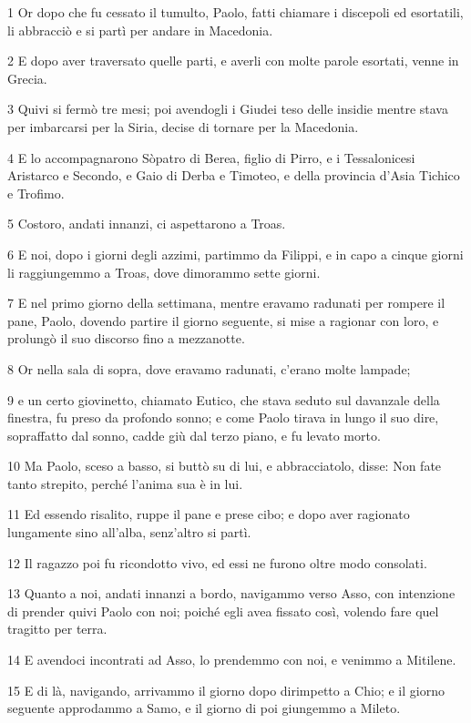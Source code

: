 \par 1 Or dopo che fu cessato il tumulto, Paolo, fatti chiamare i discepoli ed esortatili, li abbracciò e si partì per andare in Macedonia.
\par 2 E dopo aver traversato quelle parti, e averli con molte parole esortati, venne in Grecia.
\par 3 Quivi si fermò tre mesi; poi avendogli i Giudei teso delle insidie mentre stava per imbarcarsi per la Siria, decise di tornare per la Macedonia.
\par 4 E lo accompagnarono Sòpatro di Berea, figlio di Pirro, e i Tessalonicesi Aristarco e Secondo, e Gaio di Derba e Timoteo, e della provincia d'Asia Tichico e Trofimo.
\par 5 Costoro, andati innanzi, ci aspettarono a Troas.
\par 6 E noi, dopo i giorni degli azzimi, partimmo da Filippi, e in capo a cinque giorni li raggiungemmo a Troas, dove dimorammo sette giorni.
\par 7 E nel primo giorno della settimana, mentre eravamo radunati per rompere il pane, Paolo, dovendo partire il giorno seguente, si mise a ragionar con loro, e prolungò il suo discorso fino a mezzanotte.
\par 8 Or nella sala di sopra, dove eravamo radunati, c'erano molte lampade;
\par 9 e un certo giovinetto, chiamato Eutico, che stava seduto sul davanzale della finestra, fu preso da profondo sonno; e come Paolo tirava in lungo il suo dire, sopraffatto dal sonno, cadde giù dal terzo piano, e fu levato morto.
\par 10 Ma Paolo, sceso a basso, si buttò su di lui, e abbracciatolo, disse: Non fate tanto strepito, perché l'anima sua è in lui.
\par 11 Ed essendo risalito, ruppe il pane e prese cibo; e dopo aver ragionato lungamente sino all'alba, senz'altro si partì.
\par 12 Il ragazzo poi fu ricondotto vivo, ed essi ne furono oltre modo consolati.
\par 13 Quanto a noi, andati innanzi a bordo, navigammo verso Asso, con intenzione di prender quivi Paolo con noi; poiché egli avea fissato così, volendo fare quel tragitto per terra.
\par 14 E avendoci incontrati ad Asso, lo prendemmo con noi, e venimmo a Mitilene.
\par 15 E di là, navigando, arrivammo il giorno dopo dirimpetto a Chio; e il giorno seguente approdammo a Samo, e il giorno di poi giungemmo a Mileto.
